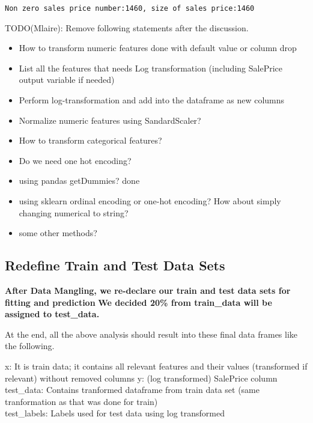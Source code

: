 \documentclass[11pt]{article}
\begin{document}
    \begin{Verbatim}[commandchars=\\\{\}]
Non zero sales price number:1460, size of sales price:1460

    \end{Verbatim}

    TODO(Mlaire): Remove following statements after the discussion.

\begin{itemize}
\item
  How to transform numeric features done with default value or column
  drop
\item
  List all the features that needs Log transformation (including
  SalePrice output variable if needed)
\item
  Perform log-transformation and add into the dataframe as new columns
\item
  Normalize numeric features using SandardScaler?
\item
  How to transform categorical features?
\item
  Do we need one hot encoding?
\item
  using pandas getDummies? done
\item
  using sklearn ordinal encoding or one-hot encoding? How about simply
  changing numerical to string?
\item
  some other methods?
\end{itemize}

    \subsection{Redefine Train and Test Data
Sets}\label{redefine-train-and-test-data-sets}

\textbf{After Data Mangling, we re-declare our train and test data sets
for fitting and prediction} \textbf{We decided 20\% from train\_data
will be assigned to test\_data.}

    At the end, all the above analysis should result into these final data
frames like the following.

x: It is train data; it contains all relevant features and their values
(transformed if relevant) without removed columns y: (log transformed)
SalePrice column\\
test\_data: Contains tranformed dataframe from train data set (same
tranformation as that was done for train)\\
test\_labels: Labels used for test data using log transformed
\end{document}
